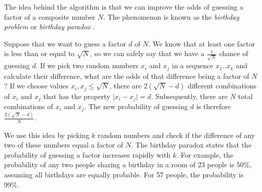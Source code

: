 \documentclass[paper=a4, fontsize=11pt,numbers=endperiod]{scrartcl} %
\providecommand{\abs}[1]{\lvert#1\rvert} %
\numberwithin{equation}{section} %
\numberwithin{figure}{section} %
\numberwithin{table}{section} %
\begin{document}
The idea behind the algorithm is that we can improve the odds of guessing a factor of a composite number $N$.
The phenomenon is known as the \emph{birthday problem} or \emph{birthday paradox} \cite{birthday}.


Suppose that we want to guess a factor $d$ of $N$.
We know that at least one factor is less than or equal to $\sqrt{N}$, so we can safely say that we have a $\frac{1}{\sqrt{N}}$ chance of guessing $d$.
If we pick two random numbers $x_i$ and $x_j$ in a sequence $x_1 .. x_k$ and calculate their difference, what are the odds of that difference being a factor of $N$?
If we choose values $x_i, x_j \leq \sqrt{N}$, there are $2(\sqrt{N}-d)$ different combinations of $x_i$ and $x_j$ that has the property $\abs{x_i - x_j} = d$. %
Subsequently, there are $N$ total combinations of $x_i$ and $x_j$.
The new probability of guessing $d$ is therefore $\frac{2(\sqrt{N}-d)}{N}$. \cite{colorado}

We use this idea by picking $k$ random numbers and check if the difference of any two of these numbers equal a factor of $N$.
The birthday paradox states that the probability of guessing a factor increases rapidly with $k$.
For example, the probability of any two people sharing a birthday in a room of 23 people is 50\%, assuming all birthdays are equally probable.
For 57 people, the probability is 99\%.
\end{document}
